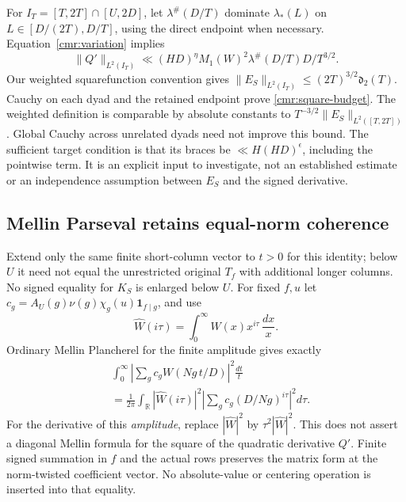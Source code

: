 For $I_T=[T,2T]\cap[U,2D]$, let $\lambda^\#(D/T)$ dominate
$\lambda_*(L)$ on $L\in[D/(2T),D/T]$, using the direct endpoint
when necessary. Equation~\eqref{cmr:variation} implies
\[
 \|Q'\|_{L^2(I_T)}\ll(HD)^\eta M_1(W)^2
                         \lambda^\#(D/T)D/T^{3/2}.
\]
Our weighted squarefunction convention gives
$\|E_S\|_{L^2(I_T)}\le(2T)^{3/2}\mathfrak d_2(T)$.
Cauchy on each dyad and the retained endpoint prove
\eqref{cmr:square-budget}. The weighted definition is comparable by
absolute constants to $T^{-3/2}\|E_S\|_{L^2([T,2T])}$.
Global Cauchy across unrelated dyads need not improve this bound.
The sufficient target condition is that its braces be
$\ll H(HD)^\epsilon$, including the pointwise term. It is an explicit
input to investigate, not an established estimate or an independence
assumption between $E_S$ and the signed derivative.

\subsection{Mellin Parseval retains equal-norm coherence}\label{cmr:mellin}
Extend only the same finite short-column vector to $t>0$ for this
identity; below $U$ it need not equal the unrestricted original
$T_f$ with additional longer columns. No signed equality for $K_S$
is enlarged below $U$. For fixed $f,u$ let
$c_g=A_U(g)\nu(g)\chi_g(u)\mathbf1_{f\mid g}$, and use
\[
 \widehat W(i\tau)=\int_0^\infty W(x)x^{i\tau}\,\frac{dx}{x}.
\]
Ordinary Mellin Plancherel for the finite amplitude gives exactly
\begin{equation}\label{cmr:parseval}
 \begin{split}
 &\int_0^\infty\left|\sum_g c_gW(Ng\,t/D)\right|^2\frac{dt}{t}\\
 &=\frac1{2\pi}\int_{\mathbb R}|\widehat W(i\tau)|^2
                   \left|\sum_gc_g(D/Ng)^{i\tau}\right|^2d\tau.
 \end{split}
\end{equation}
For the derivative of this \emph{amplitude}, replace
$|\widehat W|^2$ by $\tau^2|\widehat W|^2$.
This does not assert a diagonal Mellin formula for the square of the
quadratic derivative $Q'$.
Finite signed summation in $f$ and the actual rows preserves the
matrix form at the norm-twisted coefficient vector. No absolute-value
or centering operation is inserted into that equality.

